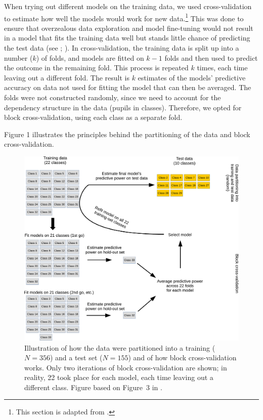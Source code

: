 \documentclass[output=paper]{langsci/langscibook}
\begin{document}
When trying out different models on the training data, we used cross-validation to estimate how well the models would work for new data.\footnote{This section is adapted from \citet{VanhoveEtAl2019}.} This was done to ensure that overzealous data exploration and model fine-tuning would not result in a model that fits the training data well but stands little chance of predicting the test data (see \citealt{KuhnJohnson2013}; \citealt{YarkoniWestfall2017}). In cross-validation, the training data is split up into a number ($k$) of folds, and models are fitted on $k-1$ folds and then used to predict the outcome in the remaining fold. This process is repeated $k$ times, each time leaving out a different fold. The result is $k$ estimates of the models’ predictive accuracy on data not used for fitting the model that can then be averaged. The folds were not constructed randomly, since we need to account for the dependency structure in the data (pupils in classes). Therefore, we opted for block cross-validation, using each class as a separate fold.

Figure 1 illustrates the principles behind the partitioning of the data and block cross-validation.


\begin{figure}
\includegraphics[width=\textwidth]{figures/figure4.1.cross-validation.pdf}
\caption{Illustration of how the data were partitioned into a training ($N=356$) and a test set ($N=155$) and of how block cross-validation works. Only two iterations of block cross-validation are shown; in reality, 22 took place for each model, each time leaving out a different class. Figure based on Figure~3 in \citet{VanhoveEtAl2019}.}
\label{fig:04:1}
\end{figure}
\end{document}
